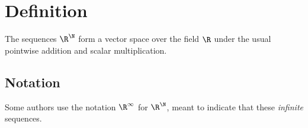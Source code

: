 
\section*{Definition}

The sequences $\R ^\N  $ form a vector space over the field $\R $ under the usual pointwise addition and scalar multiplication.

\subsection*{Notation}

Some authors use the notation $\R ^\infty$ for $\R ^\N  $, meant to indicate that these \textit{infinite} sequences.

\blankpage